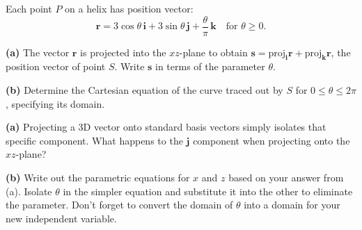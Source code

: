 \begin{problem}
\begin{minipage}{0.55\textwidth}
Each point $P$ on a helix has position vector:
$$ \mathbf{r} = 3\cos\theta \, \mathbf{i} + 3\sin\theta \, \mathbf{j} + \frac{\theta}{\pi} \, \mathbf{k} \quad \text{for } \theta \ge 0. $$

\textbf{(a)} The vector $\mathbf{r}$ is projected into the $xz$-plane to obtain $\mathbf{s} = \text{proj}_{\mathbf{i}} \mathbf{r} + \text{proj}_{\mathbf{k}} \mathbf{r}$, the position vector of point $S$. Write $\mathbf{s}$ in terms of the parameter $\theta$.

\textbf{(b)} Determine the Cartesian equation of the curve traced out by $S$ for $0 \le \theta \le 2\pi$, specifying its domain.
\end{minipage}%
\hfill
\begin{minipage}{0.4\textwidth}
\begin{center}
\end{center}
\end{minipage}
\end{problem}

\begin{hint}
\textbf{(a)} Projecting a 3D vector onto standard basis vectors simply isolates that specific component. What happens to the $\mathbf{j}$ component when projecting onto the $xz$-plane?

\textbf{(b)} Write out the parametric equations for $x$ and $z$ based on your answer from (a). Isolate $\theta$ in the simpler equation and substitute it into the other to eliminate the parameter. Don't forget to convert the domain of $\theta$ into a domain for your new independent variable.
\end{hint}

